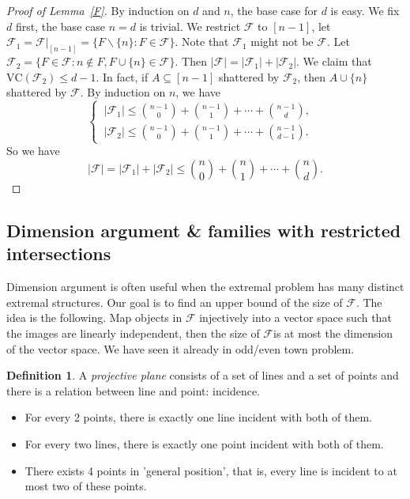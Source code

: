 \documentclass{article}
\theoremstyle{definition}
\newtheorem{definition}[theorem]{Definition}
\newcommand{\VC}{\mathrm{VC}}
\begin{document}
\begin{proof}[Proof of Lemma~\ref{F}]
    By induction on $d$ and $n$, the base case for $d$ is easy. We fix $d$ first, the base case $n=d$ is trivial. We restrict $\mathcal{F}$ to $[n-1]$, let $\mathcal{F}_{1}=\mathcal{F}|_{[n-1]}=\{ F\backslash \{ n \} :F\in \mathcal{F} \}$. Note that $\mathcal{F}_{1}$ might not be $\mathcal{F}$. Let $\mathcal{F}_{2}=\{ F\in \mathcal{F}: n\notin F, F\cup\{ n \} \in \mathcal{F} \}$. Then $|\mathcal{F}|=|\mathcal{F}_{1}|+|\mathcal{F}_{2}|$. We claim that $\VC(\mathcal{F}_{2})\leq d-1$. In fact, if $A\subseteq [n-1]$ shattered by $\mathcal{F}_{2}$, then $A\cup \{ n \}$ shattered by $\mathcal{F}$. By induction on $n$, we have
    \begin{equation*}
    \left\{
    \begin{aligned}
         \ |\mathcal{F}_{1}|\leq \binom{n-1}{0}+\binom{n-1}{1}+\cdots+\binom{n-1}{d}, &  \\
         \ |\mathcal{F}_{2}|\leq \binom{n-1}{0}+\binom{n-1}{1}+\cdots+\binom{n-1}{d-1}. & 
    \end{aligned}
    \right.
    \end{equation*}
    So we have
    $$|\mathcal{F}|=|\mathcal{F}_{1}|+|\mathcal{F}_{2}|\leq \binom{n}{0}+\binom{n}{1}+\cdots+\binom{n}{d}.$$
\end{proof}

\subsection{Dimension argument \& families with restricted intersections}

Dimension argument is often useful when the extremal problem has many distinct extremal structures. Our goal is to find an upper bound of the size of $\mathcal{F}$. The idea is the following. Map objects in $\mathcal{F}$ injectively into a vector space such that the images are linearly independent, then the size of $\mathcal{F}$is at most the dimension of the vector space. We have seen it already in odd/even town problem.

\begin{definition}
    A \emph{projective plane} consists of a set of lines and a set of points and there is a relation between line and point: incidence.
    \begin{itemize}
    \item For every 2 points, there is exactly one line incident with both of them.
    \item For every two lines, there is exactly one point incident with both of them.
    \item There exists 4 points in 'general position', that is, every line is incident to at most two of these points.
\end{itemize}
\end{definition}
\end{document}
